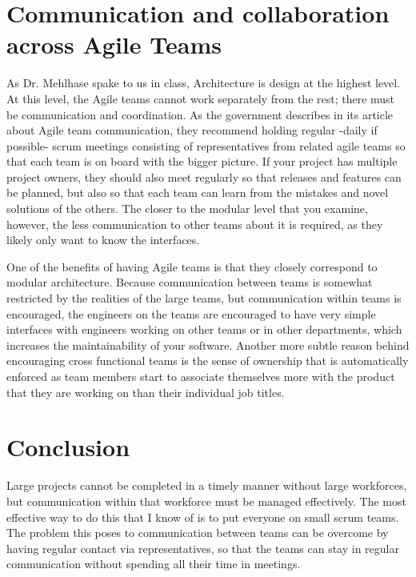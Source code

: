 \documentclass[sigplan,screen]{acmart}
\begin{document}
\section{Communication and collaboration across Agile Teams}
As Dr. Mehlhase spake to us in class, Architecture is design at the highest level. At this level, the Agile teams cannot work separately from the rest; there must be communication and coordination. As the government describes in its article about Agile team communication, they recommend holding regular -daily if possible- scrum meetings consisting of representatives from related agile teams so that each team is on board with the bigger picture. \cite{Lulit} If your project has multiple project owners, they should also meet regularly so that releases and features can be planned, but also so that each team can learn from the mistakes and novel solutions of the others. \cite{Lulit} The closer to the modular level that you examine, however, the less communication to other teams about it is required, as they likely only want to know the interfaces. 

One of the benefits of having Agile teams is that they closely correspond to modular architecture. Because communication between teams is somewhat restricted by the realities of the large teams, but communication within teams is encouraged, the engineers on the teams are encouraged to have very simple interfaces with engineers working on other teams or in other departments, which increases the maintainability of your software. Another more subtle reason behind encouraging cross functional teams is the sense of ownership that is automatically enforced as team members start to associate themselves more with the product that they are working on than their individual job titles.\cite{David}

\section{Conclusion}
Large projects cannot be completed in a timely manner without large workforces, but communication within that workforce must be managed effectively. The most effective way to do this that I know of is to put everyone on small scrum teams. The problem this poses to communication between teams can be overcome by having regular contact via representatives, so that the teams can stay in regular communication without spending all their time in meetings.





\end{document}
